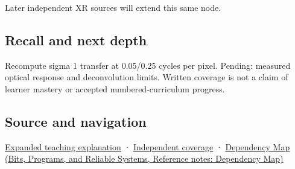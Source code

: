 Later independent XR sources will extend this same node.

\subsection{Recall and next depth}\label{appendix-8b76b0efd27f-recall-and-next-depth}

Recompute sigma 1 transfer at 0.05/0.25 cycles per pixel. Pending: measured optical response and deconvolution limits. Written coverage is not a claim of learner mastery or accepted numbered-curriculum progress.

\subsection{Source and navigation}\label{appendix-8b76b0efd27f-source-and-navigation}

\hyperref[04-visual-computing-ii-ch042-a-footprint-is-more-meaningful-than-an-isolated-pixel-center]{Expanded teaching explanation} · \hyperref[appendix-fd090d982a15-xr01---independent-seeing-and-representation-source]{Independent coverage} · \href{../01-Bits-Programs-and-Reliable-Systems/main.pdf\#nameddest=appendix-4ad47bdd269a}{Dependency Map (Bits, Programs, and Reliable Systems, Reference notes: Dependency Map)}
